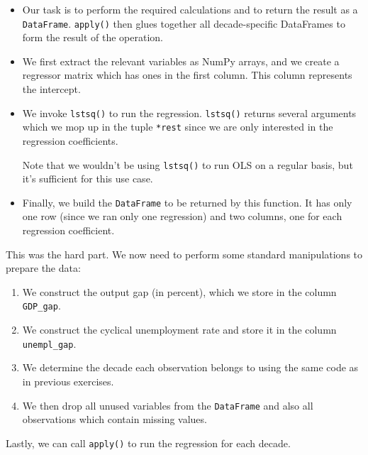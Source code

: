 \documentclass[10pt]{scrartcl}
\providecommand{\tightlist}{%
      \setlength{\itemsep}{0pt}\setlength{\parskip}{0pt}}
\begin{document}
\begin{itemize}
\item
  Our task is to perform the required calculations and to return the
  result as a \texttt{DataFrame}. \texttt{apply()} then glues together
  all decade-specific DataFrames to form the result of the operation.
\item
  We first extract the relevant variables as NumPy arrays, and we create
  a regressor matrix which has ones in the first column. This column
  represents the intercept.
\item
  We invoke \texttt{lstsq()} to run the regression. \texttt{lstsq()}
  returns several arguments which we mop up in the tuple \texttt{*rest}
  since we are only interested in the regression coefficients.

  Note that we wouldn't be using \texttt{lstsq()} to run OLS on a
  regular basis, but it's sufficient for this use case.
\item
  Finally, we build the \texttt{DataFrame} to be returned by this
  function. It has only one row (since we ran only one regression) and
  two columns, one for each regression coefficient.
\end{itemize}

This was the hard part. We now need to perform some standard
manipulations to prepare the data:

\begin{enumerate}
\def\labelenumi{\arabic{enumi}.}
\tightlist
\item
  We construct the output gap (in percent), which we store in the column
  \texttt{GDP\_gap}.
\item
  We construct the cyclical unemployment rate and store it in the column
  \texttt{unempl\_gap}.
\item
  We determine the decade each observation belongs to using the same
  code as in previous exercises.
\item
  We then drop all unused variables from the \texttt{DataFrame} and also
  all observations which contain missing values.
\end{enumerate}

Lastly, we can call \texttt{apply()} to run the regression for each
decade.
\end{document}
